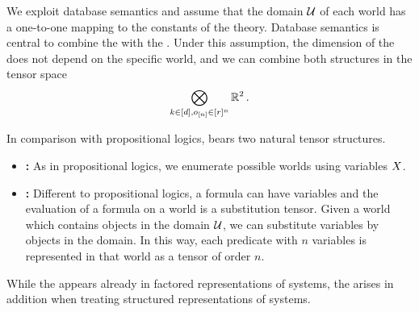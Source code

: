 
We exploit database semantics and assume that the domain $\mathcal{U}$ of each world has a one-to-one mapping to the constants of the theory.
Database semantics is central to combine the \semanticStructure{} with the \substitutionStructure{}.
Under this assumption, the dimension of the \substitutionStructure{} does not depend on the specific world, and we can combine both structures in the tensor space
\begin{align*}
    \bigotimes_{k\in[d],o_{[n]}\in[r]^{n}} \mathbb{R}^2 \, .
\end{align*}


In comparison with propositional logics, \firstOrderLogic{} bears two natural tensor structures.
\begin{itemize}
    \item \textbf{\SemanticStructure{}:} As in propositional logics, we enumerate possible worlds using variables $X$.
    \item \textbf{\SubstitutionStructure{}:}
    Different to propositional logics, a formula can have variables and the evaluation of a formula on a world is a substitution tensor.
    Given a world which contains objects in the domain $\mathcal{U}$, we can substitute variables by objects in the domain. In this way, each predicate with $n$ variables is represented in that world as a tensor of order $n$.
\end{itemize}

While the \semanticStructure{} appears already in factored representations of systems, the \substitutionStructure{} arises in addition when treating structured representations of systems.









